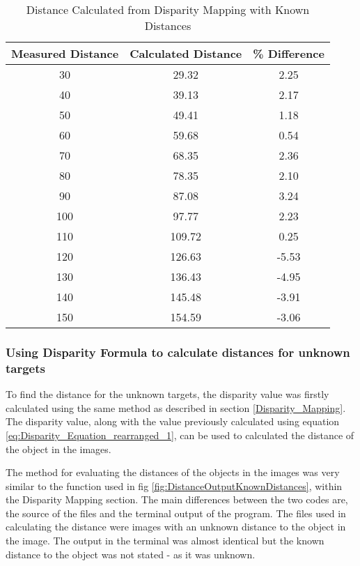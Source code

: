 \documentclass[conference]{IEEEtran}
\begin{document}
\begin{table}
\begin{center}
\caption{Distance Calculated from Disparity Mapping with Known Distances}
\begin{tabular}{ || c || c || c || }
\hline
 Measured Distance & Calculated Distance & \% Difference\\ 
\hline
 30 & 29.32 & 2.25 \\  
\hline
 40 & 39.13 & 2.17 \\  
\hline
 50 & 49.41 & 1.18 \\  
\hline
 60 & 59.68 & 0.54 \\  
\hline
 70 & 68.35 & 2.36 \\  
\hline
 80 & 78.35 & 2.10 \\  
\hline
 90 & 87.08 & 3.24 \\  
\hline
 100 & 97.77 & 2.23 \\  
\hline
 110 & 109.72 & 0.25 \\  
\hline
 120 & 126.63 & -5.53 \\  
\hline
 130 & 136.43 & -4.95 \\  
\hline
 140 & 145.48 & -3.91 \\  
\hline
 150 & 154.59 & -3.06 \\  
\hline

\end{tabular}
\label{table:distance_values_for_known_values}
\end{center}
\end{table}

\subsubsection{Using Disparity Formula to calculate distances for unknown targets} 
To find the distance for the unknown targets, the disparity value was firstly calculated using the same method as described in section \ref{Disparity_Mapping}. The disparity value, along with the value previously calculated using equation \ref{eq:Disparity_Equation_rearranged_1}, can be used to calculated the distance of the object in the images. 

The method for evaluating the distances of the objects in the images was very similar to the function used in fig \ref{fig:DistanceOutputKnownDistances}, within the Disparity Mapping section. The main differences between the two codes are, the source of the files and the terminal output of the program. The files used in calculating the distance were images with an unknown distance to the object in the image. The output in the terminal was almost identical but the known distance to the object was not stated - as it was unknown. 
\end{document}
